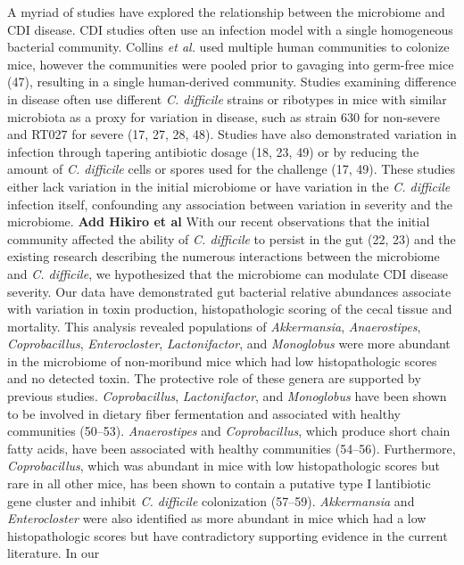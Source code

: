 \documentclass[
  12pt,
]{article}
\begin{document}
A myriad of studies have explored the relationship between the
microbiome and CDI disease. CDI studies often use an infection model
with a single homogeneous bacterial community. Collins \emph{et al.}
used multiple human communities to colonize mice, however the
communities were pooled prior to gavaging into germ-free mice (47),
resulting in a single human-derived community. Studies examining
difference in disease often use different \emph{C. difficile} strains or
ribotypes in mice with similar microbiota as a proxy for variation in
disease, such as strain 630 for non-severe and RT027 for severe (17, 27,
28, 48). Studies have also demonstrated variation in infection through
tapering antibiotic dosage (18, 23, 49) or by reducing the amount of
\emph{C. difficile} cells or spores used for the challenge (17, 49).
These studies either lack variation in the initial microbiome or have
variation in the \emph{C. difficile} infection itself, confounding any
association between variation in severity and the microbiome.
\textbf{Add Hikiro et al} With our recent observations that the initial
community affected the ability of \emph{C. difficile} to persist in the
gut (22, 23) and the existing research describing the numerous
interactions between the microbiome and \emph{C. difficile}, we
hypothesized that the microbiome can modulate CDI disease severity. Our
data have demonstrated gut bacterial relative abundances associate with
variation in toxin production, histopathologic scoring of the cecal
tissue and mortality. This analysis revealed populations of
\emph{Akkermansia}, \emph{Anaerostipes}, \emph{Coprobacillus},
\emph{Enterocloster}, \emph{Lactonifactor}, and \emph{Monoglobus} were
more abundant in the microbiome of non-moribund mice which had low
histopathologic scores and no detected toxin. The protective role of
these genera are supported by previous studies. \emph{Coprobacillus},
\emph{Lactonifactor}, and \emph{Monoglobus} have been shown to be
involved in dietary fiber fermentation and associated with healthy
communities (50--53). \emph{Anaerostipes} and \emph{Coprobacillus},
which produce short chain fatty acids, have been associated with healthy
communities (54--56). Furthermore, \emph{Coprobacillus}, which was
abundant in mice with low histopathologic scores but rare in all other
mice, has been shown to contain a putative type I lantibiotic gene
cluster and inhibit \emph{C. difficile} colonization (57--59).
\emph{Akkermansia} and \emph{Enterocloster} were also identified as more
abundant in mice which had a low histopathologic scores but have
contradictory supporting evidence in the current literature. In our
\end{document}
